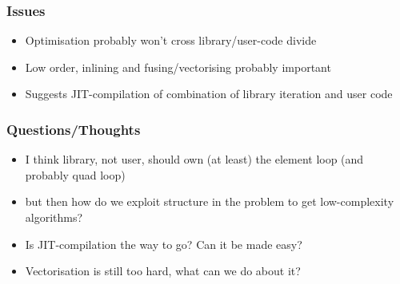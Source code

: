 \documentclass[presentation]{beamer}
\begin{document}
\begin{frame}
  \frametitle{Issues}
  \begin{itemize}
  \item Optimisation probably won’t cross library/user-code divide
  \item Low order, inlining and fusing/vectorising probably important
  \item Suggests JIT-compilation of combination of library iteration
    and user code
  \end{itemize}
\end{frame}

\begin{frame}
  \frametitle{Questions/Thoughts}
  \begin{itemize}
  \item I think library, not user, should own (at least) the element loop
    (and probably quad loop)
  \item but then how do we exploit structure in the problem to get
    low-complexity algorithms?
  \item Is JIT-compilation the way to go? Can it be made easy?
  \item Vectorisation is still too hard, what can we do about it?
  \end{itemize}
\end{frame}
\end{document}
